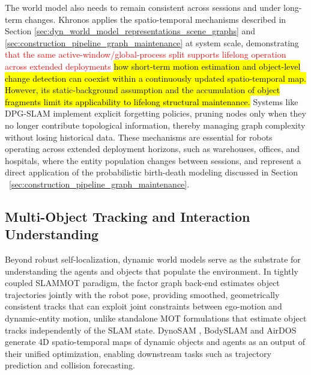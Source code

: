 The world model also needs to remain consistent across sessions and under long-term changes. 
Khronos \cite{schmid_khronos_2024} applies the spatio-temporal mechanisms described in Section \ref{sec:dyn_world_model_representations_scene_graphs} and \ref{sec:construction_pipeline_graph_maintenance} at system scale, demonstrating \textcolor{red}{that the same active-window/global-process split supports lifelong operation across extended deployments} \hl{how short-term motion estimation and object-level change detection can coexist within a continuously updated spatio-temporal map. However, its static-background assumption and the accumulation of object fragments limit its applicability to lifelong structural maintenance.}
Systems like DPG-SLAM \cite{walcott-bryant_dynamic_2012} implement explicit forgetting policies, pruning nodes only when they no longer contribute topological information, thereby managing graph complexity without losing historical data.
These mechanisms are essential for robots operating across extended deployment horizons, such as warehouses, offices, and hospitals, where the entity population changes between sessions, and represent a direct application of the probabilistic birth-death modeling discussed in Section ~\ref{sec:construction_pipeline_graph_maintenance}.

\subsection{Multi-Object Tracking and Interaction Understanding}\label{sec:applications_mot}
Beyond robust self-localization, dynamic world models serve as the substrate for understanding the agents and objects that populate the environment. 
In tightly coupled SLAMMOT paradigm, the factor graph back-end estimates object trajectories jointly with the robot pose, providing smoothed, geometrically consistent tracks that  can exploit joint constraints between ego-motion and dynamic-entity motion, unlike standalone MOT formulations that estimate object tracks independently of the SLAM state. 
DynoSAM \cite{morris_dynosam_2025}, BodySLAM \cite{henning_bodyslam_2022} and AirDOS \cite{qiu2022airdos} generate 4D spatio-temporal maps of dynamic objects and agents as an output of their unified optimization, enabling downstream tasks such as trajectory prediction and collision forecasting.

